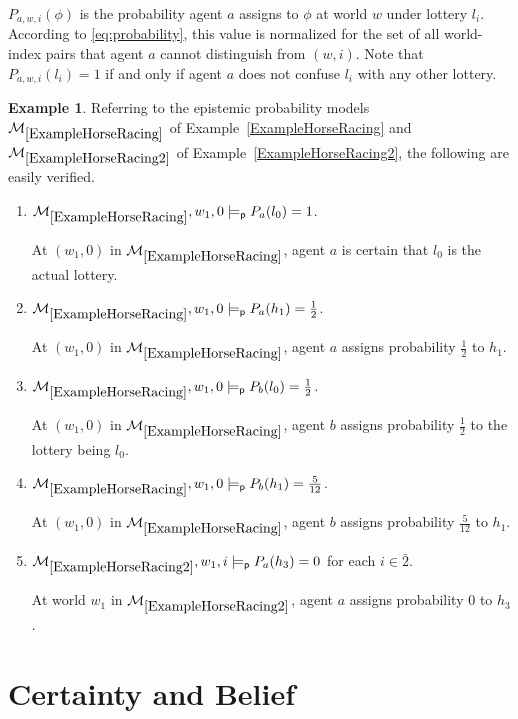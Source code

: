 \documentclass[12pt]{article}
\theoremstyle{definition}
\newtheorem{example}[theorem]{Example}
\newcommand{\M}{{\cal M}}      %
\newcommand{\modelsp}{\models_{\mathsf{p}}}                  %
\begin{document}
$P_{a,w,i} (\phi)$ is the probability agent $a$ assigns to $\phi$ at
world $w$ under lottery $l_i$. According to \eqref{eq:probability},
this value is normalized for the set of all world-index pairs that
agent $a$ cannot distinguish from $(w,i)$.  Note that $P_{a,w,i} (l_i)
= 1$ if and only if agent $a$ does not confuse $l_i$ with any other
lottery.

\begin{example}
  Referring to the epistemic probability models
  $\M_{\ref{ExampleHorseRacing}}$ of Example~\ref{ExampleHorseRacing}
  and $\M_{\ref{ExampleHorseRacing2}}$ of
  Example~\ref{ExampleHorseRacing2}, the following are easily
  verified.
  \begin{enumerate}
  \item $\M_{\ref{ExampleHorseRacing}},w_1,0\modelsp P_a(l_0)= 1$.
    
    At $(w_1,0)$ in $\M_{\ref{ExampleHorseRacing}}$, agent $a$ is
    certain that $l_0$ is the actual lottery.
    
  \item $\M_{\ref{ExampleHorseRacing}},w_1,0\modelsp P_a(h_1) =
    \frac{1}{2}$.
    
    At $(w_1,0)$ in $\M_{\ref{ExampleHorseRacing}}$, agent $a$ assigns
    probability $\frac 12$ to $h_1$.
    
  \item $\M_{\ref{ExampleHorseRacing}},w_1,0\modelsp P_b(l_0) =
    \frac{1}{2}$.
    
    At $(w_1,0)$ in $\M_{\ref{ExampleHorseRacing}}$, agent $b$ assigns
    probability $\frac 12$ to the lottery being $l_0$.
    
  \item $\M_{\ref{ExampleHorseRacing}},w_1,0\modelsp P_b(h_1) = \frac{5}{12}$.

    At $(w_1,0)$ in $\M_{\ref{ExampleHorseRacing}}$, agent $b$ assigns
    probability $\frac 5{12}$ to $h_1$.

  \item $\M_{\ref{ExampleHorseRacing2}},w_1,i\modelsp P_a(h_3)=0$ for
    each $i\in\bar 2$.

    At world $w_1$ in $\M_{\ref{ExampleHorseRacing2}}$, agent $a$
    assigns probability $0$ to $h_3$.
  \end{enumerate}
\end{example}


\section{Certainty and Belief} 
\label{Section:CB} 
\end{document}
